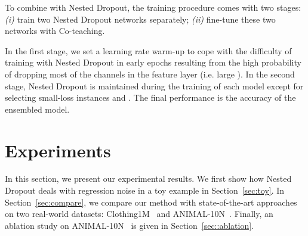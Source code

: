\documentclass[final]{cvpr}
\begin{document}
To combine with Nested Dropout, the training procedure comes with two stages:
\textit{(i)} train two Nested Dropout networks separately;
\textit{(ii)} fine-tune these two networks with {Co-teaching}.

In the first stage, we set a learning rate warm-up to cope with the difficulty of training with Nested Dropout in early epochs resulting from the high probability of dropping most of the channels in the feature layer (i.e. large ).
In the second stage, Nested Dropout is maintained during the training of each model except for selecting small-loss instances  and . The final performance is the accuracy of the ensembled model.






\section{Experiments} \label{sec::exp}
In this section, we present our experimental results. 
We first show how Nested Dropout deals with regression noise in a toy example in Section~\ref{sec:toy}. 
In Section~\ref{sec:compare}, we compare our method with state-of-the-art approaches on two real-world datasets: Clothing1M~\cite{xiao2015learning} and ANIMAL-10N~\cite{song2019selfie}. 
Finally, an ablation study on ANIMAL-10N~\cite{song2019selfie} is given in Section~\ref{sec::ablation}. 
\end{document}
